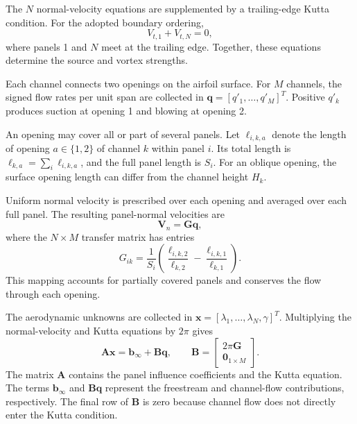 \documentclass[a4paper,fleqn]{cas-dc}
\begin{document}
The $N$ normal-velocity equations are supplemented by a trailing-edge Kutta condition.
For the adopted boundary ordering,
\begin{equation}
	V_{t,1}+V_{t,N}=0,
	\label{eq:kutta_condition}
\end{equation}
where panels 1 and $N$ meet at the trailing edge.
Together, these equations determine the source and vortex strengths.

Each channel connects two openings on the airfoil surface.
For $M$ channels, the signed flow rates per unit span
are collected in $\mathbf{q}=[q'_1,\ldots,q'_M]^T$.
Positive $q'_k$ produces suction at opening 1 and
blowing at opening 2.

An opening may cover all or part of several panels.
Let $\ell_{i,k,a}$ denote the length of opening
$a\in\{1,2\}$ of channel $k$ within panel $i$.
Its total length is $\ell_{k,a}=\sum_i\ell_{i,k,a}$,
and the full panel length is $S_i$.
For an oblique opening, the surface opening length
can differ from the channel height $H_k$.

Uniform normal velocity is prescribed over each opening
and averaged over each full panel.
The resulting panel-normal velocities are
\begin{equation}
	\mathbf{V}_n=\mathbf{G}\mathbf{q},
	\label{eq:normal_velocity_map}
\end{equation}
where the $N\times M$ transfer matrix has entries
\begin{equation}
	G_{ik}
	=
	\frac{1}{S_i}
	\left(
	\frac{\ell_{i,k,2}}{\ell_{k,2}}
	-
	\frac{\ell_{i,k,1}}{\ell_{k,1}}
	\right).
	\label{eq:opening_transfer_operator}
\end{equation}
This mapping accounts for partially covered panels
and conserves the flow through each opening.

The aerodynamic unknowns are collected in
$\mathbf{x}=[\lambda_1,\ldots,\lambda_N,\gamma]^T$.
Multiplying the normal-velocity and Kutta equations
by $2\pi$ gives
\begin{equation}
	\mathbf{A}\mathbf{x}
	=
	\mathbf{b}_{\infty}+\mathbf{B}\mathbf{q},
	\qquad
	\mathbf{B}
	=
	\begin{bmatrix}
		2\pi\mathbf{G}\\
		\mathbf{0}_{1\times M}
	\end{bmatrix}.
	\label{eq:aero_matrix}
\end{equation}
The matrix $\mathbf{A}$ contains the panel influence
coefficients and the Kutta equation.
The terms $\mathbf{b}_{\infty}$ and $\mathbf{B}\mathbf{q}$
represent the freestream and channel-flow contributions,
respectively.
The final row of $\mathbf{B}$ is zero because channel
flow does not directly enter the Kutta condition.
\end{document}
